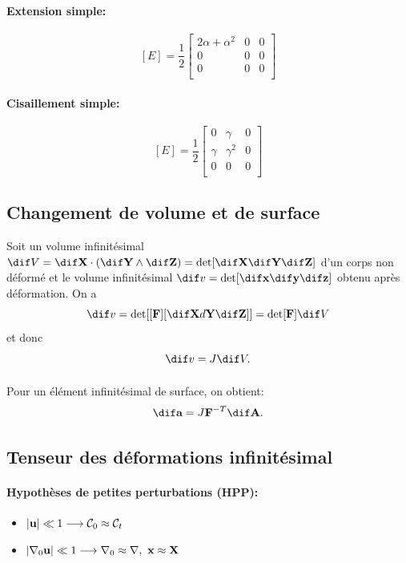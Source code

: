 \paragraph{Extension simple:}
$$[E]=\frac{1}{2}
\left[\begin{array}{ccc}
2\alpha+\alpha^2&0&0\\
0&0&0\\
0&0&0\\
\end{array}\right]$$
\paragraph{Cisaillement simple:}
$$[E]=\frac{1}{2}
\left[\begin{array}{ccc}
0&\gamma&0\\
\gamma&\gamma^2&0\\
0&0&0\\
\end{array}\right]$$

\subsection{Changement de volume et de surface}
Soit un volume infinitésimal $\dif V=\dif \fv{X}\cdot(\dif\fv{Y}\wedge \dif\fv{Z})=\det[\dif\fv{X}\dif\fv{Y}\dif\fv{Z}]$ d'un corps non déformé et le volume infinitésimal $\dif v=\det[\dif\fv{x}\dif\fv{y}\dif\fv{z}]$ obtenu après déformation. On a
$$\dif v=\det[[\fv{F}][\dif\fv{X}d\fv{Y}\dif\fv{Z}]]=\det[\fv{F}]\dif V$$
et donc $$\dif v=J\dif V.$$
\paragraph{}
Pour un élément infinitésimal de surface, on obtient: $$\dif\fv{a}=J\fv{F}^{-T}\dif\fv{A}.$$
\subsection{Tenseur des déformations infinitésimal}
\label{défo_infinit}
\paragraph{Hypothèses de petites perturbations (HPP):}
\begin{itemize}
\item $|\textbf{u}|\ll 1\longrightarrow \mathcal{C}_0\approx \mathcal{C}_t$
\item $|\nabla_0\textbf{u}|\ll 1\longrightarrow \nabla_0\approx\nabla,\,\,\textbf{x}\approx\textbf{X}$
\end{itemize}
